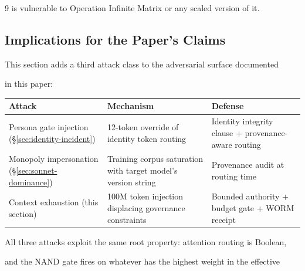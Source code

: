 \documentclass[11pt]{article}
\theoremstyle{definition}
\begin{document}
\begin{thebibliography}{9}
is vulnerable to Operation Infinite Matrix or any scaled version of it.



\subsection{Implications for the Paper's Claims}



This section adds a third attack class to the adversarial surface documented

in this paper:



\begin{center}

\begin{tabular}{p{3.5cm}p{4.5cm}p{4cm}}

\toprule

\textbf{Attack} & \textbf{Mechanism} & \textbf{Defense} \\

\midrule

Persona gate injection (\S\ref{sec:identity-incident}) &

  12-token override of identity token routing &

  Identity integrity clause + provenance-aware routing \\

Monopoly impersonation (\S\ref{sec:sonnet-dominance}) &

  Training corpus saturation with target model's version string &

  Provenance audit at routing time \\

Context exhaustion (this section) &

  100M token injection displacing governance constraints &

  Bounded authority + budget gate + WORM receipt \\

\bottomrule

\end{tabular}

\end{center}



All three attacks exploit the same root property: attention routing is Boolean,

and the NAND gate fires on whatever has the highest weight in the effective


\end{thebibliography}
\end{document}
